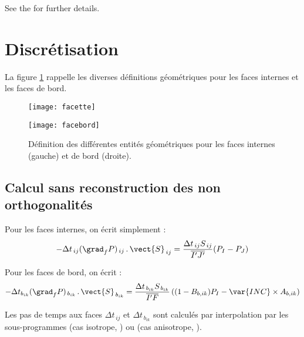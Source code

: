 See the 
for further details.

\section*{Discr\'etisation}

La figure \ref{Base_Itrmas_fig_geom} rappelle les diverses d\'efinitions g\'eom\'etriques
pour les faces internes et les faces de bord.

\begin{figure}[h]
\parbox{8cm}{%
\centerline{\texttt{[image: facette]}}}
\parbox{8cm}{%
\centerline{\texttt{[image: facebord]}}}
\caption{\label{Base_Itrmas_fig_geom}D\'efinition des diff\'erentes entit\'es
g\'eom\'etriques pour les faces internes (gauche) et de bord (droite).}
\end{figure}


\subsection*{Calcul sans reconstruction des non orthogonalit\'es}
Pour les faces internes, on \'ecrit simplement :
\begin{equation}
\label{Base_Itrmas_eq_intssrec}
-\Delta t_{\,ij}(\grad_f P)_{\,ij}\,.\,\vect{S}_{\,ij}=
\frac{\Delta t_{\,ij}S_{\,ij}}{\overline{I^\prime J^\prime}}(P_I-P_J)
\end{equation}

Pour les faces de bord, on \'ecrit :
\begin{equation}
\label{Base_Itrmas_eq_brdssrec}
-\Delta t_{b_{ik}}(\grad_f P)_{\,b_{ik}}\,.\,\vect{S}_{\,b_{ik}}=
\frac{\Delta t_{\,b_{ik}}S_{\,b_{ik}}}{\overline{I^\prime F}}
\left((1-B_{b,ik})P_I-\var{INC}\times A_{b,ik}\right)
\end{equation}

Les pas de temps aux faces $\Delta t_{\,ij}$ et $\Delta t_{\,b_{ik}}$ sont calcul\'es
par interpolation par les sous-programmes  (cas isotrope,
) ou  (cas anisotrope, ).



